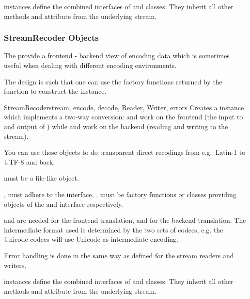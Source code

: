  instances define the combined interfaces of
 and  classes. They inherit
all other methods and attribute from the underlying stream.


\subsubsection{StreamRecoder Objects \label{stream-recoder-objects}}

The  provide a frontend - backend view of
encoding data which is sometimes useful when dealing with different
encoding environments.

The design is such that one can use the factory functions returned by
the  function to construct the instance.

\begin{classdesc}{StreamRecoder}{stream, encode, decode,
                                 Reader, Writer, errors}
  Creates a  instance which implements a two-way
  conversion:  and  work on the frontend (the
  input to  and output of ) while
   and  work on the backend (reading and
  writing to the stream).

  You can use these objects to do transparent direct recodings from
  e.g.\ Latin-1 to UTF-8 and back.

   must be a file-like object.

  ,  must adhere to the 
  interface, ,  must be factory functions or
  classes providing objects of the  and
   interface respectively.

   and  are needed for the frontend
  translation,  and  for the backend
  translation.  The intermediate format used is determined by the two
  sets of codecs, e.g. the Unicode codecs will use Unicode as
  intermediate encoding.

  Error handling is done in the same way as defined for the
  stream readers and writers.
\end{classdesc}

 instances define the combined interfaces of
 and  classes. They inherit
all other methods and attribute from the underlying stream.


